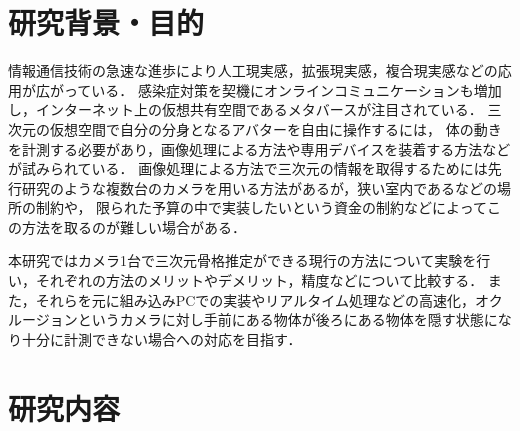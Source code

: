 \documentclass[titlepage]{jarticle}
\begin{document}
\maketitle

%
%
\section{研究背景・目的}
%
情報通信技術の急速な進歩により人工現実感，拡張現実感，複合現実感などの応用が広がっている．
感染症対策を契機にオンラインコミュニケーションも増加し，インターネット上の仮想共有空間であるメタバースが注目されている．
三次元の仮想空間で自分の分身となるアバターを自由に操作するには，
体の動きを計測する必要があり，画像処理による方法\cite{CV}や専用デバイスを装着する方法\cite{キャプチャ}などが試みられている．
画像処理による方法で三次元の情報を取得するためには先行研究のような複数台のカメラを用いる方法\cite{turugi}があるが，狭い室内であるなどの場所の制約や，
限られた予算の中で実装したいという資金の制約などによってこの方法を取るのが難しい場合がある．

本研究ではカメラ1台で三次元骨格推定ができる現行の方法について実験を行い，それぞれの方法のメリットやデメリット，精度などについて比較する．
また，それらを元に組み込みPCでの実装やリアルタイム処理などの高速化，オクルージョンというカメラに対し手前にある物体が後ろにある物体を隠す状態になり十分に計測できない場合への対応を目指す．
%
%
\section{研究内容}

%
%
\end{document}
